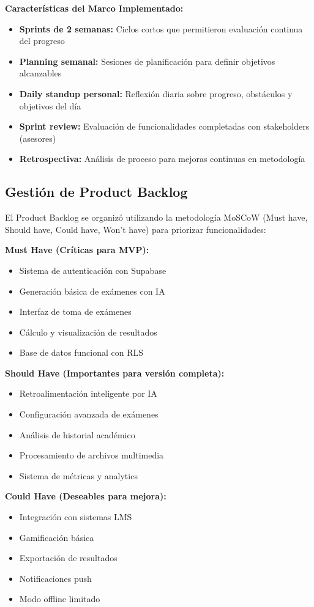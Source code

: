 \documentclass[12pt,a4paper]{report}
\begin{document}
\textbf{Características del Marco Implementado:}
\begin{itemize}
\item \textbf{Sprints de 2 semanas:} Ciclos cortos que permitieron evaluación continua del progreso
\item \textbf{Planning semanal:} Sesiones de planificación para definir objetivos alcanzables
\item \textbf{Daily standup personal:} Reflexión diaria sobre progreso, obstáculos y objetivos del día
\item \textbf{Sprint review:} Evaluación de funcionalidades completadas con stakeholders (asesores)
\item \textbf{Retrospectiva:} Análisis de proceso para mejoras continuas en metodología
\end{itemize}

\subsection{Gestión de Product Backlog}

El Product Backlog se organizó utilizando la metodología MoSCoW (Must have, Should have, Could have, Won't have) para priorizar funcionalidades:

\textbf{Must Have (Críticas para MVP):}
\begin{itemize}
\item Sistema de autenticación con Supabase
\item Generación básica de exámenes con IA
\item Interfaz de toma de exámenes
\item Cálculo y visualización de resultados
\item Base de datos funcional con RLS
\end{itemize}

\textbf{Should Have (Importantes para versión completa):}
\begin{itemize}
\item Retroalimentación inteligente por IA
\item Configuración avanzada de exámenes
\item Análisis de historial académico
\item Procesamiento de archivos multimedia
\item Sistema de métricas y analytics
\end{itemize}

\textbf{Could Have (Deseables para mejora):}
\begin{itemize}
\item Integración con sistemas LMS
\item Gamificación básica
\item Exportación de resultados
\item Notificaciones push
\item Modo offline limitado
\end{itemize}
\end{document}
